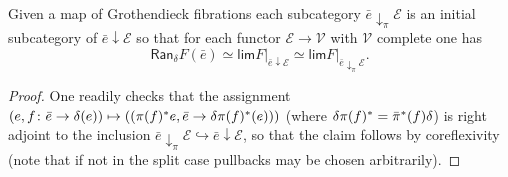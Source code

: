 \documentclass[a4paper,10pt]{article}%
\begin{document}
\begin{proposition}\label{FIBERKANMAP PROP}
	Given a map of Grothendieck fibrations
	each subcategory $\bar{e} \downarrow_{\pi} \mathcal{E}$ is an initial subcategory of $\bar{e} \downarrow \mathcal{E}$
	so that for each functor 
	$\mathcal{E} \to \mathcal{V}$
	with $\mathcal{V}$ complete one has
\begin{equation}\label{FIBERKANMAP EQ}
	\mathsf{Ran}_{\delta}F (\bar{e})
\simeq
	\mathsf{lim} F{|_{\bar{e} \downarrow \mathcal{E}}}
\simeq
	\mathsf{lim} F|_{\bar{e} \downarrow_{\pi} \mathcal{E}}.
\end{equation}	
\end{proposition}

\begin{proof}
One readily checks that the assignment
$
	(e,f\colon\bar{e} \to \delta(e))
\mapsto
	\left(
	(\pi(f)^{\**}e, \bar{e} \to \delta \pi(f)^{\**}(e))
	\right)
$
(where $\delta \pi(f)^{\**} = \bar{\pi}^{\**}(f) \delta$) is  right adjoint to the inclusion
$\bar{e} \downarrow_{\pi} \mathcal{E} \hookrightarrow
\bar{e} \downarrow \mathcal{E}$, so that the claim follows by coreflexivity (note that if not in the split case pullbacks may be chosen arbitrarily).
\end{proof}


\end{document}
